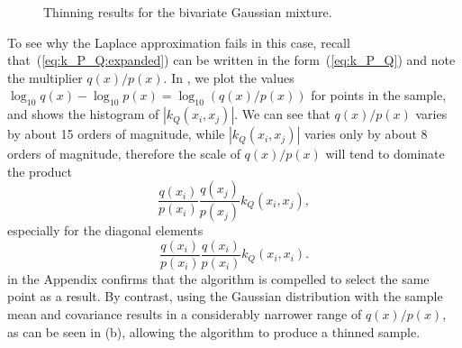 \documentclass[11pt,a4paper]{report}
\begin{document}
\begin{figure}[h!]
\centering
{}
\caption{Thinning results for the bivariate Gaussian mixture.
\label{fig:gmm:thinned}}
\end{figure}

To see why the Laplace approximation fails in this case, recall that~(\ref{eq:k_P_Q:expanded}) can be written in the form~(\ref{eq:k_P_Q}) and note the multiplier $q(x) / p(x)$. In , we plot the values $\log_{10} q(x) - \log_{10} p(x) = \log_{10} (q(x) / p(x))$ for points in the sample, and  shows the histogram of $|k_Q(x_i, x_j)|$. We can see that $q(x) / p(x)$ varies by about 15 orders of magnitude, while $|k_Q(x_i, x_j)|$ varies only by about 8 orders of magnitude, therefore the scale of $q(x) / p(x)$ will tend to dominate the product
\begin{equation*}
\frac{q(x_i)}{p(x_i)} \frac{q(x_j)}{p(x_j)} k_Q(x_i, x_j),
\end{equation*}
especially for the diagonal elements
\begin{equation*}
\frac{q(x_i)}{p(x_i)} \frac{q(x_i)}{p(x_i)} k_Q(x_i, x_i).
\end{equation*}
 in the Appendix confirms that the algorithm is compelled to select the same point as a result. By contrast, using the Gaussian distribution with the sample mean and covariance results in a considerably narrower range of $q(x) / p(x)$, as can be seen in (b), allowing the algorithm to produce a thinned sample.
\end{document}
